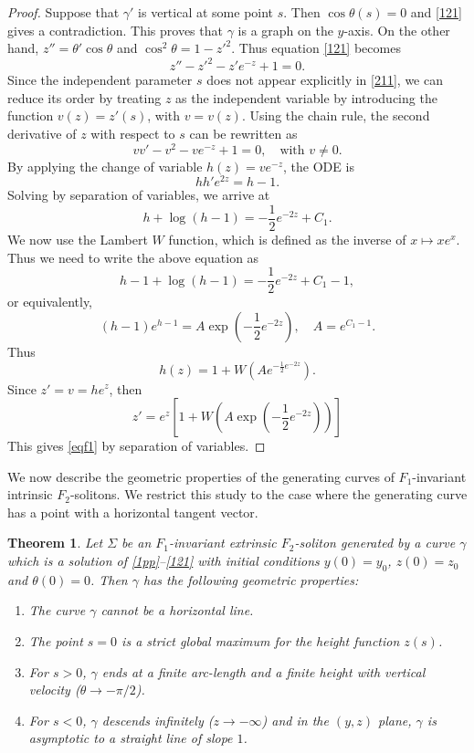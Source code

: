 \documentclass[a4paper,12pt]{amsart}
\theoremstyle{plain}
\newtheorem{theorem}{Theorem}[section]
\theoremstyle{definition}
\begin{document}
\begin{proof}
Suppose that $\gamma'$ is vertical at some point $s$. Then $\cos\theta(s)=0$ and \eqref{121} gives a contradiction. This proves that $\gamma$ is a graph on the $y$-axis. On the other hand, $z''=\theta'\cos\theta$ and $\cos^2\theta=1-z'^2$. Thus equation \eqref{121} becomes
\begin{equation}\label{211}
z'' - z'^2 - z' e^{-z} + 1 = 0.
\end{equation}
 Since the independent parameter $s$ does not appear explicitly in \eqref{211}, we can reduce its order by treating $z$ as the independent variable by introducing the function $v(z) = z'(s)$, with $v=v(z)$. Using the chain rule, the second derivative of $z$ with respect to $s$ can be rewritten as
 \begin{equation}\label{eq211}
v v' - v^2 - v e^{-z} + 1 = 0, \quad \text{with } v \neq 0.
\end{equation} 
By applying the change of variable $h(z) = v e^{-z}$, the ODE is 
$$hh'e^{2z}=h-1.$$
Solving by separation of variables, we arrive at 
$$
h + \log(h-1) = -\frac{1}{2}e^{-2z} + C_1.
$$
We now use the Lambert $W$ function, which is defined as the inverse of $x\mapsto xe^x$. Thus we need to write the above equation as
$$h-1 + \log(h-1) = -\frac{1}{2}e^{-2z} + C_1-1,$$
or equivalently, 
$$(h-1)e^{h-1}=A\exp(-\frac{1}{2}e^{-2z}),\quad A=e^{C_1-1}.$$
 Thus 
 $$h(z)=1+ W\left( A e^{-\frac{1}{2} e^{-2z}} \right).$$
Since $z' = v = he^z$, then 
\begin{equation*}
z' = e^z \left[ 1 + W\left( A \exp\left( -\frac{1}{2} e^{-2z} \right) \right) \right]
\end{equation*}
This gives \eqref{eqf1} by separation of variables. 
 

\end{proof}

We now describe the geometric properties of the generating curves of $F_1$-invariant intrinsic $F_2$-solitons. We restrict this study to the case where the generating curve has a point with a horizontal tangent vector. 
 

 \begin{theorem} \label{t55}
Let $\Sigma$ be an $F_1$-invariant extrinsic $F_2$-soliton generated by a curve $\gamma$ which is a solution of \eqref{1pp}--\eqref{121} with initial conditions $y(0)=y_0$, $z(0)=z_0$ and $\theta(0)=0$. Then $\gamma$ has the following geometric properties: 
\begin{enumerate}
 \item The curve $\gamma$ cannot be a horizontal line.
 \item The point $s=0$ is a strict global maximum for the height function $z(s)$. 
 \item For $s>0$, $\gamma$ ends at a finite arc-length and a finite height with vertical velocity ($\theta \to -\pi/2$).
 \item For $s<0$, $\gamma$ descends infinitely ($z \to -\infty$) and in the $(y,z)$ plane, $\gamma$ is asymptotic to a straight line of slope $ 1$.
\end{enumerate}
\end{theorem}
\end{document}
